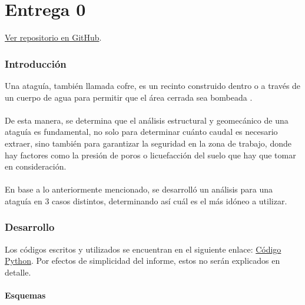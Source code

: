 \part{Entrega 0}
\begin{center}
  \href{https://github.com/LukasWolff2002/PROYECTO_1_MCOCo}{Ver repositorio en GitHub}.
\end{center}

\section{Introducción}

Una ataguía, también llamada cofre, es un recinto construido dentro o a través de un cuerpo de agua para permitir que el área cerrada sea bombeada \textbf{\citet{acerlum2023}}.
\\ \\
De esta manera, se determina que el análisis estructural y geomecánico de una ataguía es fundamental, no solo para determinar cuánto caudal es necesario extraer, sino también para garantizar la seguridad en la zona de trabajo, donde hay factores como la presión de poros o licuefacción del suelo que hay que tomar en consideración.
\\ \\
En base a lo anteriormente mencionado, se desarrolló un análisis para una ataguía en 3 casos distintos, determinando así cuál es el más idóneo a utilizar.

\section{Desarrollo}

Los códigos escritos y utilizados se encuentran en el siguiente enlace: \href{https://github.com/LukasWolff2002/PROYECTO_1_MCOC/tree/main/CODIGO}{Código Python}. Por efectos de simplicidad del informe, estos no serán explicados en detalle.

\subsection{Esquemas}


